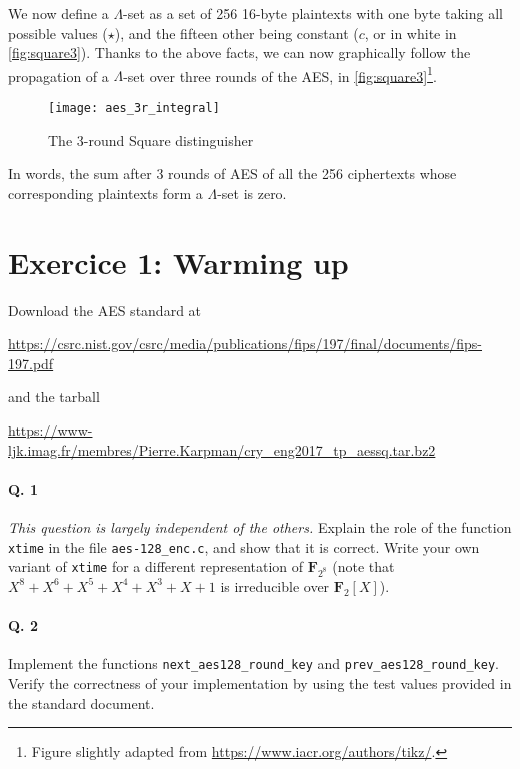 \documentclass[a4paper,11pt]{article}
\begin{document}
We now define a $\Lambda$-set as a set of 256 16-byte plaintexts with one byte taking all possible values ($\star$), and the fifteen other being constant ($c$,
or in white in \autoref{fig:square3}).
Thanks to the above facts, we can now graphically follow the propagation of a $\Lambda$-set over three rounds of the AES, in \autoref{fig:square3}\footnote{Figure slightly adapted from \href{https://www.iacr.org/authors/tikz/}{https://www.iacr.org/authors/tikz/}.}.

\begin{figure}[!hbt]
\centering
\texttt{[image: aes\_3r\_integral]}
\caption{The 3-round Square distinguisher\label{fig:square3}}
\end{figure}

In words, the sum after 3 rounds of AES of all the 256 ciphertexts whose corresponding plaintexts form a $\Lambda$-set is zero.


\section*{Exercice 1: Warming up}

Download the AES standard at
\begin{center}
\href{https://csrc.nist.gov/csrc/media/publications/fips/197/final/documents/fips-197.pdf}{https://csrc.nist.gov/csrc/media/publications/fips/197/final/documents/fips-197.pdf}
\end{center}
and the tarball
\begin{center}
 \href{https://www-ljk.imag.fr/membres/Pierre.Karpman/cry\_eng2017\_tp\_aessq.tar.bz2}{https://www-ljk.imag.fr/membres/Pierre.Karpman/cry\_eng2017\_tp\_aessq.tar.bz2}
\end{center}

\paragraph*{Q. 1} \emph{This question is largely independent of the others.}
Explain the role of the function \texttt{xtime} in the file \texttt{aes-128\_enc.c}, and show that it is correct.
Write your own variant of \texttt{xtime} for a different representation of $\mathbf{F}_{2^8}$ (note that
$X^8 + X^6 + X^5 + X^4 + X^3 + X + 1$ is irreducible over $\mathbf{F}_2[X]$).

\paragraph*{Q. 2} Implement the functions \texttt{next\_aes128\_round\_key} and \texttt{prev\_aes128\_round\_key}. Verify the correctness of
your implementation by using the test values provided in the standard document.
\end{document}
